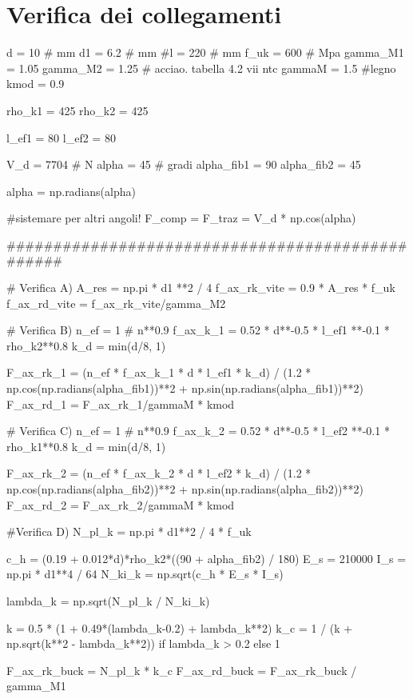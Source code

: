 \chapter{Verifica dei collegamenti}
\begin{pycode}[viti]
d = 10 # mm
d1 = 6.2 # mm
#l = 220 # mm 
f_uk = 600 # Mpa
gamma_M1 = 1.05
gamma_M2 = 1.25 # acciao. tabella 4.2 vii ntc
gammaM = 1.5 #legno
kmod = 0.9

rho_k1 = 425
rho_k2 = 425

l_ef1 = 80
l_ef2 = 80

V_d = 7704 # N
alpha = 45 # gradi
alpha_fib1 = 90
alpha_fib2 = 45

alpha = np.radians(alpha)


#sistemare per altri angoli!
F_comp = F_traz = V_d * np.cos(alpha)

#################################################

# Verifica A)
A_res = np.pi * d1 **2 / 4
f_ax_rk_vite = 0.9 * A_res * f_uk 
f_ax_rd_vite = f_ax_rk_vite/gamma_M2

# Verifica B)
n_ef = 1 # n**0.9 
f_ax_k_1 = 0.52 * d**-0.5 * l_ef1 **-0.1 * rho_k2**0.8
k_d = min(d/8, 1)

F_ax_rk_1 = (n_ef * f_ax_k_1 * d * l_ef1 * k_d) / (1.2 * np.cos(np.radians(alpha_fib1))**2 + np.sin(np.radians(alpha_fib1))**2)
F_ax_rd_1 = F_ax_rk_1/gammaM * kmod

# Verifica C)
n_ef = 1 # n**0.9 
f_ax_k_2 = 0.52 * d**-0.5 * l_ef2 **-0.1 * rho_k1**0.8
k_d = min(d/8, 1)

F_ax_rk_2 = (n_ef * f_ax_k_2 * d * l_ef2 * k_d) / (1.2 * np.cos(np.radians(alpha_fib2))**2 + np.sin(np.radians(alpha_fib2))**2)
F_ax_rd_2 = F_ax_rk_2/gammaM * kmod

#Verifica D)
N_pl_k = np.pi * d1**2 / 4 * f_uk

c_h = (0.19 + 0.012*d)*rho_k2*((90 + alpha_fib2) / 180)
E_s = 210000
I_s = np.pi * d1**4 / 64
N_ki_k = np.sqrt(c_h * E_s * I_s)

lambda_k = np.sqrt(N_pl_k / N_ki_k)

k = 0.5 * (1 + 0.49*(lambda_k-0.2) + lambda_k**2)
k_c = 1 / (k + np.sqrt(k**2 - lambda_k**2)) if lambda_k > 0.2 else  1

F_ax_rk_buck = N_pl_k * k_c
F_ax_rd_buck = F_ax_rk_buck / gamma_M1
\end{pycode}
